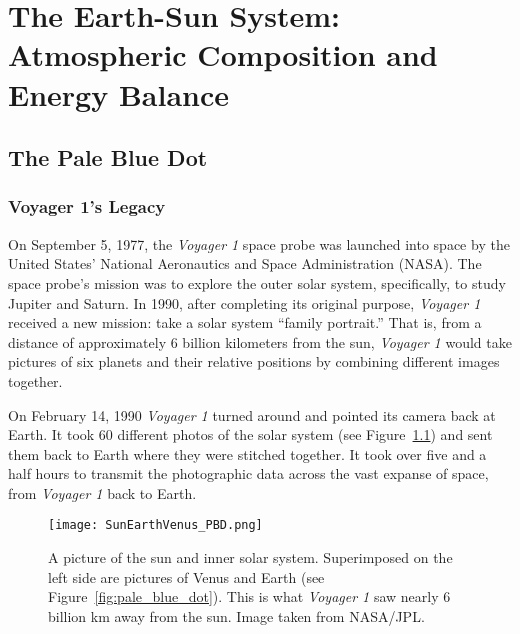 
\chapter{The Earth-Sun System: Atmospheric Composition and Energy Balance}\label{ch:earth_sun} 

\section{\label{sec:pbd}The Pale Blue Dot}

\subsection{Voyager 1's Legacy}

On September 5, 1977, the \emph{Voyager 1} space probe was launched into space by the United States' National Aeronautics and Space Administration (NASA). The space probe's mission was to explore the outer solar system, specifically, to study Jupiter and Saturn. In 1990, after completing its original purpose,  \emph{Voyager 1} received a new mission: take a solar system ``family portrait.'' That is, from a distance of approximately 6 billion kilometers from the sun, \emph{Voyager 1} would take pictures of six planets and their relative positions by combining different images together.

On February 14, 1990  \emph{Voyager 1} turned around and pointed its camera back at Earth. It took 60 different photos of the solar system (see Figure~\ref{fig:EarthSunVenus}) and sent them back to Earth where they were stitched together. It took over five and a half hours to transmit the photographic data across the vast expanse of space, from \emph{Voyager 1} back to Earth. 

    \begin{figure}[ht]
    \centering
		\texttt{[image: SunEarthVenus\_PBD.png]}
		\caption{A picture of the sun and inner solar system. Superimposed on the left side are pictures of Venus and Earth (see Figure~\ref{fig:pale_blue_dot}). This is what \emph{Voyager 1} saw nearly 6 billion \si{\km} away from the sun. Image taken from NASA/JPL.}
        \label{fig:EarthSunVenus}
    \end{figure}

